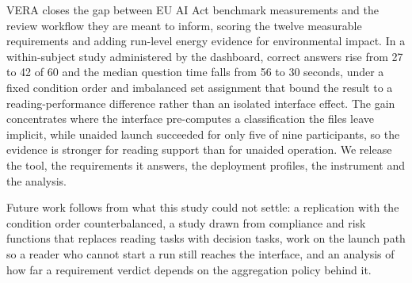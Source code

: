 \documentclass[10pt,conference,a4paper]{IEEEtran}
\begin{document}
VERA closes the gap between EU AI Act benchmark measurements and the review workflow they are meant to inform, scoring the twelve measurable requirements and adding run-level energy evidence for environmental impact. In a within-subject study administered by the dashboard, correct answers rise from 27 to 42 of 60 and the median question time falls from 56 to 30 seconds, under a fixed condition order and imbalanced set assignment that bound the result to a reading-performance difference rather than an isolated interface effect. The gain concentrates where the interface pre-computes a classification the files leave implicit, while unaided launch succeeded for only five of nine participants, so the evidence is stronger for reading support than for unaided operation. We release the tool, the requirements it answers, the deployment profiles, the instrument and the analysis.

Future work follows from what this study could not settle: a replication with the condition order counterbalanced, a study drawn from compliance and risk functions that replaces reading tasks with decision tasks, work on the launch path so a reader who cannot start a run still reaches the interface, and an analysis of how far a requirement verdict depends on the aggregation policy behind it.


\clearpage
{\footnotesize


}




\end{document}
